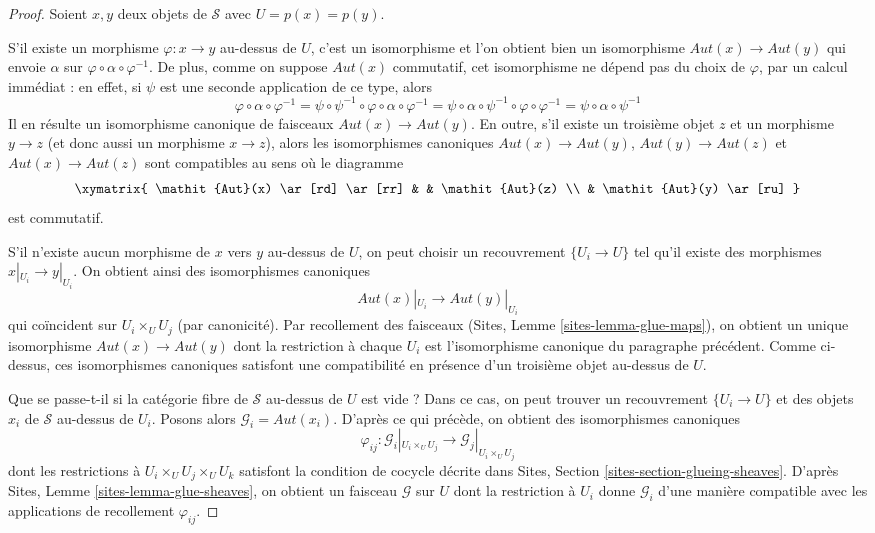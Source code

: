 \begin{proof}
Soient $x, y$ deux objets de $\mathcal{S}$ avec $U = p(x) = p(y)$.

\medskip\noindent
S'il existe un morphisme $\varphi : x \to y$ au-dessus de $U$, c'est un
isomorphisme et l'on obtient bien un isomorphisme
$\mathit{Aut}(x) \to \mathit{Aut}(y)$ qui envoie
$\alpha$ sur $\varphi \circ \alpha \circ \varphi^{-1}$.
De plus, comme on suppose $\mathit{Aut}(x)$
commutatif, cet isomorphisme ne dépend pas du choix
de $\varphi$, par un calcul immédiat : en effet, si $\psi$ est
une seconde application de ce type, alors
$$
\varphi \circ \alpha \circ \varphi^{-1} =
\psi \circ \psi^{-1} \circ \varphi \circ \alpha \circ \varphi^{-1} =
\psi \circ \alpha \circ \psi^{-1} \circ \varphi \circ \varphi^{-1} =
\psi \circ \alpha \circ \psi^{-1}
$$
Il en résulte un isomorphisme canonique de faisceaux
$\mathit{Aut}(x) \to \mathit{Aut}(y)$. En outre, s'il existe
un troisième objet $z$ et un morphisme $y \to z$ (et donc
aussi un morphisme $x \to z$), alors les
isomorphismes canoniques $\mathit{Aut}(x) \to \mathit{Aut}(y)$,
$\mathit{Aut}(y) \to \mathit{Aut}(z)$ et
$\mathit{Aut}(x) \to \mathit{Aut}(z)$ sont compatibles au sens
où le diagramme
$$
\xymatrix{
\mathit{Aut}(x) \ar[rd] \ar[rr] & &  \mathit{Aut}(z) \\
& \mathit{Aut}(y) \ar[ru]
}
$$
est commutatif.

\medskip\noindent
S'il n'existe aucun morphisme de $x$ vers $y$ au-dessus de $U$, on peut
choisir un recouvrement $\{U_i \to U\}$ tel qu'il existe des morphismes
$x|_{U_i} \to y|_{U_i}$. On obtient ainsi des isomorphismes canoniques
$$
\mathit{Aut}(x)|_{U_i} \longrightarrow \mathit{Aut}(y)|_{U_i}
$$
qui coïncident sur $U_i \times_U U_j$ (par canonicité). Par recollement des
faisceaux (Sites, Lemme \ref{sites-lemma-glue-maps}), on obtient un unique
isomorphisme $\mathit{Aut}(x) \to \mathit{Aut}(y)$ dont la restriction
à chaque $U_i$ est l'isomorphisme canonique du paragraphe précédent.
Comme ci-dessus, ces isomorphismes canoniques satisfont une
compatibilité en présence d'un troisième objet au-dessus de $U$.

\medskip\noindent
Que se passe-t-il si la catégorie fibre de $\mathcal{S}$ au-dessus de $U$ est vide ?
Dans ce cas, on peut trouver un recouvrement $\{U_i \to U\}$
et des objets $x_i$ de $\mathcal{S}$ au-dessus de $U_i$. Posons alors
$\mathcal{G}_i = \mathit{Aut}(x_i)$. D'après ce qui précède, on obtient
des isomorphismes canoniques
$$
\varphi_{ij} :
\mathcal{G}_i|_{U_i \times_U U_j}
\longrightarrow
\mathcal{G}_j|_{U_i \times_U U_j}
$$
dont les restrictions à $U_i \times_U U_j \times_U U_k$ satisfont
la condition de cocycle décrite dans Sites, Section
\ref{sites-section-glueing-sheaves}.
D'après Sites, Lemme \ref{sites-lemma-glue-sheaves},
on obtient un faisceau $\mathcal{G}$ sur $U$ dont la
restriction à $U_i$ donne $\mathcal{G}_i$
d'une manière compatible avec les applications de recollement $\varphi_{ij}$.


\end{proof}
